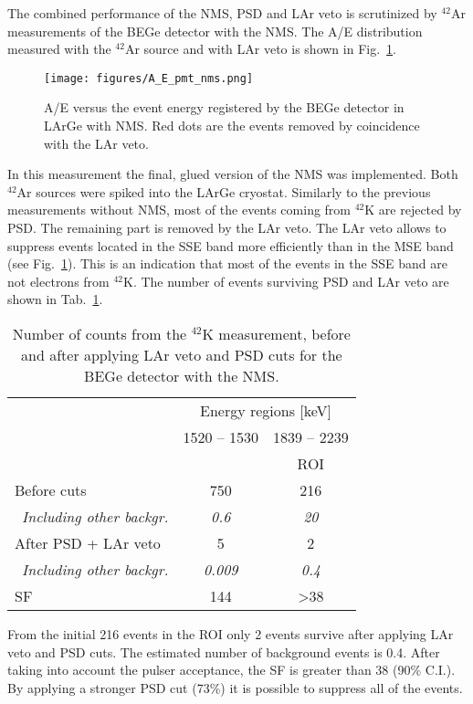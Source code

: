 \documentclass[twocolumn,epjc3]{svjour3}
\newcommand{\LArGe} {{{LArGe}\xspace}}
\newcommand{\I}[2]{$^{#1}$#2}
\begin{document}
The combined performance of the NMS, PSD and LAr veto is scrutinized by \I{42}{Ar} measurements of the BEGe detector with the NMS. The A/E distribution measured with the \I{42}{Ar} source and with LAr veto is shown in Fig.~\ref{fig:ae_pmt_nms}.
%
\begin{figure}
\begin{center}
    \texttt{[image: figures/A\_E\_pmt\_nms.png]}
     \caption{\label{fig:ae_pmt_nms}A/E versus the event energy registered by the BEGe detector in \LArGe{} with NMS. Red dots are the events removed by coincidence with the LAr veto.}
\end{center}
\end{figure}
%
In this measurement the final, glued version of the NMS was implemented. Both \I{42}{Ar} sources were spiked into the \LArGe{} cryostat. Similarly to the previous measurements without NMS, most of the events coming from \I{42}{K} are rejected by PSD. The remaining part is removed by the LAr veto. The LAr veto allows to suppress events located in the SSE band more efficiently than in the MSE band (see Fig.~\ref{fig:ae_pmt_nms}). This is an indication that most of the events in the SSE band are not electrons from \I{42}{K}. The number of events surviving PSD and LAr veto are shown in Tab.~\ref{tab:suppress3}.
\begin{table}
  \begin{center}
    \caption{\label{tab:suppress3}Number of counts from the \I{42}{K} measurement, before and after applying LAr veto and PSD cuts for the BEGe detector with the NMS.}
\begin{tabular}{lcc}
\toprule
 & \multicolumn{2}{c}{Energy regions [keV]} \\
 & 1520 -- 1530 & 1839 -- 2239 \\[1mm]
 &  & ROI \\
\hline
Before cuts & 750 & 216 \\
~\textit{Including other backgr.} & \textit{0.6}  & \textit{20} \\
After PSD + LAr veto & 5 &2 \\
~\textit{Including other backgr.} & \textit{0.009} & \textit{0.4} \\
SF & 144 & \textgreater{38} \\
\bottomrule
\end{tabular}
  \end{center}
\end{table}
From the initial 216 events in the ROI only 2 events survive after applying LAr veto and PSD cuts. The estimated number of background events is 0.4. After taking into account the pulser acceptance, the SF is greater than 38 (90\% C.I.). By applying a stronger PSD cut (73\%) it is possible to suppress all of the events. 
\end{document}
